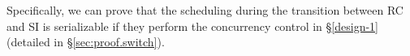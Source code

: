 
Specifically, we can prove that the scheduling during the transition between RC and SI is serializable if they perform the concurrency control in \S\ref{design-1} (detailed in \S\ref{sec:proof.switch}). 



